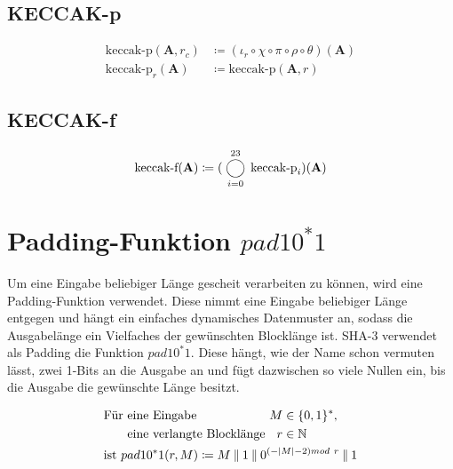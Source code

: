 \subsection{KECCAK-p}

\begin{align*}
    \text{keccak-p} (\textbf{A}, r_c) & \coloneq (\iota_r \circ \chi \circ \pi \circ \rho \circ \theta)(\textbf{A}) \\
    \text{keccak-p}_r(\textbf{A}) & \coloneq \text{keccak-p} (\textbf{A}, r)
\end{align*}

\subsection{KECCAK-f}

\begin{align*}
    \text{keccak-f} (\textbf{A}) \coloneq (\bigcomp_{i = 0}^{23} \text{keccak-p}_{i})(\textbf{A})
\end{align*}

\section{Padding-Funktion $pad10^*1$}
Um eine Eingabe beliebiger Länge gescheit verarbeiten zu können, wird eine Padding-Funktion verwendet.
Diese nimmt eine Eingabe beliebiger Länge entgegen und hängt ein einfaches dynamisches Datenmuster an,
sodass die Ausgabelänge ein Vielfaches der gewünschten Blocklänge ist.
SHA-3 verwendet als Padding die Funktion $pad10^*1$. Diese hängt, wie der Name schon vermuten lässt,
zwei 1-Bits an die Ausgabe an und fügt dazwischen so viele Nullen ein, bis die Ausgabe die gewünschte Länge besitzt.

\begin{align*}
	&\begin{alignedat}[t]{2}
	\text{Für} & \text{ eine Eingabe } & M & \in \{0,1\}^*, \\
	& \text{ eine verlangte Blocklänge } & r & \in \mathbb{N} \\
	\end{alignedat} \\
	& \text{ist } pad10^*1(r, M) \coloneq M \mathbin\Vert 1 \mathbin\Vert 0^{(-|M| - 2) mod\ r} \mathbin\Vert 1
\end{align*}

